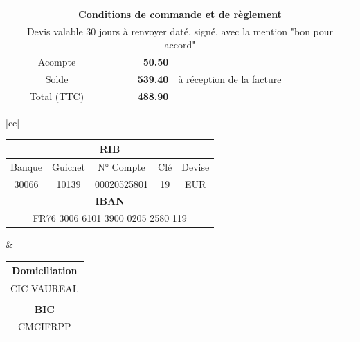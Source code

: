 \documentclass[11pt,french]{article}%
\def\Total{539.40}%
\def\totalLeft{488.90}%
\def\deposit{50.50}%
\begin{document}
\vfill
\vfill
\begin{center}
\begin{tabular}{|crl|}
	\hline
	\multicolumn{3}{|c|}{\textbf{Conditions de commande et de règlement}} \\
	\multicolumn{3}{|c|}{Devis valable 30 jours à renvoyer daté, signé, avec la mention "bon pour accord"} \\
	Acompte & \textbf{\deposit \EUR} & \\
	Solde &	\textbf{\Total \EUR} & à réception de la facture \\
	Total (TTC) & \textbf{\totalLeft \EUR} & \\
	\hline
\end{tabular}
\begin{tabular}{|cc|}
	\hline
	\begin{minipage}{10cm}
	\begin{center}
		\begin{tabular}{ccccc}
		 	\multicolumn{5}{c}{\textbf{RIB}} \\
		 	\hline
			Banque & Guichet & N° Compte & Clé & Devise \\
			30066  & 10139 & 00020525801 & 19 & EUR \\ 
			\multicolumn{5}{c}{\textbf{IBAN}} \\
			\hline
			\multicolumn{5}{c}{FR76 3006 6101 3900 0205 2580 119}
		\end{tabular}
	\end{center}
	\end{minipage} &
	\begin{minipage}{7cm}
	\begin{center}
	\begin{tabular}{c}
		\textbf{Domiciliation} \\ \hline
		CIC VAUREAL \\
		\\
		\textbf{BIC} \\ \hline
		CMCIFRPP
	\end{tabular}
	\end{center}
	\end{minipage} \\ \hline \hline


\end{tabular}
\end{center}
\end{document}
